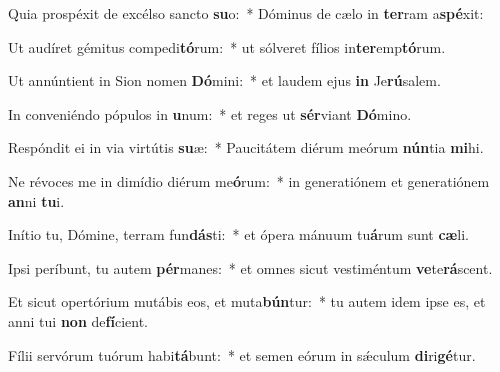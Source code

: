 \item Quia prospéxit de excélso sancto \textbf{su}o:~* Dóminus de cælo in \textbf{ter}ram a\textbf{spé}xit:
\item Ut audíret gémitus compedi\textbf{tó}rum:~* ut sólveret fílios in\textbf{ter}emp\textbf{tó}rum.
\item Ut annúntient in Sion nomen \textbf{Dó}mini:~* et laudem ejus \textbf{in} Je\textbf{rú}salem.
\item In conveniéndo pópulos in \textbf{u}num:~* et reges ut \textbf{sér}viant \textbf{Dó}mino.
\item Respóndit ei in via virtútis \textbf{su}æ:~* Paucitátem diérum meórum \textbf{nún}tia \textbf{mi}hi.
\item Ne révoces me in dimídio diérum me\textbf{ó}rum:~* in generatiónem et generatiónem \textbf{an}ni \textbf{tu}i.
\item Inítio tu, Dómine, terram fun\textbf{dás}ti:~* et ópera mánuum tu\textbf{á}rum sunt \textbf{cæ}li.
\item Ipsi períbunt, tu autem \textbf{pér}manes:~* et omnes sicut vestiméntum \textbf{ve}te\textbf{rá}scent.
\item Et sicut opertórium mutábis eos, et muta\textbf{bún}tur:~* tu autem idem ipse es, et anni tui \textbf{non} de\textbf{fí}cient.
\item Fílii servórum tuórum habi\textbf{tá}bunt:~* et semen eórum in sǽculum \textbf{di}ri\textbf{gé}tur.
